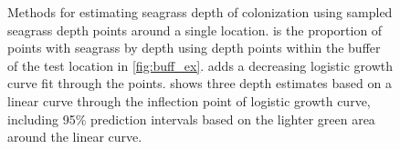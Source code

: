 \documentclass[letterpaper,12pt,oneside]{article}\usepackage[]{graphicx}\usepackage[]{color}
\begin{document}
\begin{figure}
\centering
{}


\caption{Methods for estimating seagrass depth of colonization using sampled seagrass depth points around a single location.  is the proportion of points with seagrass by depth using depth points within the buffer of the test location in \cref{fig:buff_ex}.   adds a decreasing logistic growth curve fit through the points.   shows three depth estimates based on a linear curve through the inflection point of logistic growth curve, including 95\% prediction intervals based on the lighter green area around the linear curve.}
\label{fig:est_ex}
\end{figure}

\end{document}
